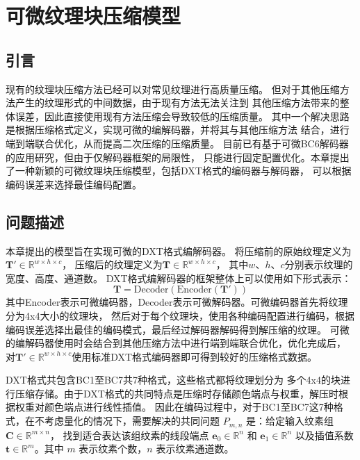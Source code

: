 
\chapter{可微纹理块压缩模型}

\section{引言}

现有的纹理块压缩方法已经可以对常见纹理进行高质量压缩。
但对于其他压缩方法产生的纹理形式的中间数据，由于现有方法无法关注到
其他压缩方法带来的整体误差，因此直接使用现有方法压缩会导致较低的压缩质量。
其中一个解决思路是根据压缩格式定义，实现可微的编解码器，并将其与其他压缩方法
结合，进行端到端联合优化，从而提高二次压缩的压缩质量。
目前已有基于可微BC6解码器的应用研究，但由于仅解码器框架的局限性，
只能进行固定配置优化。本章提出了一种新颖的可微纹理块压缩模型，包括DXT格式的编码器与解码器，
可以根据编码误差来选择最佳编码配置。

\section{问题描述}
\label{问题描述}

本章提出的模型旨在实现可微的DXT格式编解码器。
将压缩前的原始纹理定义为$\mathbf{T}'\in \mathbb{R}^{w\times h\times c}$，
压缩后的纹理定义为$\mathbf{T}\in \mathbb{R}^{w\times h\times c}$，
其中$w$、$h$、$c$分别表示纹理的宽度、高度、通道数。
DXT格式编解码器的框架整体上可以使用如下形式表示：
\begin{equation}
    \mathbf{T}=\text{Decoder}(\text{Encoder}(\mathbf{T}'))
\end{equation}
其中Encoder表示可微编码器，Decoder表示可微解码器。可微编码器首先将纹理分为4x4大小的纹理块，
然后对于每个纹理块，使用各种编码配置进行编码，根据编码误差选择出最佳的编码模式，最后经过解码器解码得到解压缩的纹理。
可微的编解码器使用时会结合到其他压缩方法中进行端到端联合优化，优化完成后，
对$\mathbf{T}'\in \mathbb{R}^{w\times h\times c}$使用标准DXT格式编码器即可得到较好的压缩格式数据。

DXT格式共包含BC1至BC7共7种格式，这些格式都将纹理划分为
多个4x4的块进行压缩存储。由于DXT格式的共同特点是压缩时存储颜色端点与权重，解压时根据权重对颜色端点进行线性插值。
因此在编码过程中，对于BC1至BC7这7种格式，在不考虑量化的情况下，需要解决的共同问题 $P_{m,n}$ 是：给定输入纹素组 $\mathbf{C}\in\mathbb{R}^{m\times n}$，
找到适合表达该组纹素的线段端点 $\mathbf{e}_0\in\mathbb{R}^n$ 和 $\mathbf{e}_1\in\mathbb{R}^n$ 
以及插值系数 $\mathbf{t}\in\mathbb{R}^m$。其中 $m$ 表示纹素个数，$n$ 表示纹素通道数。

